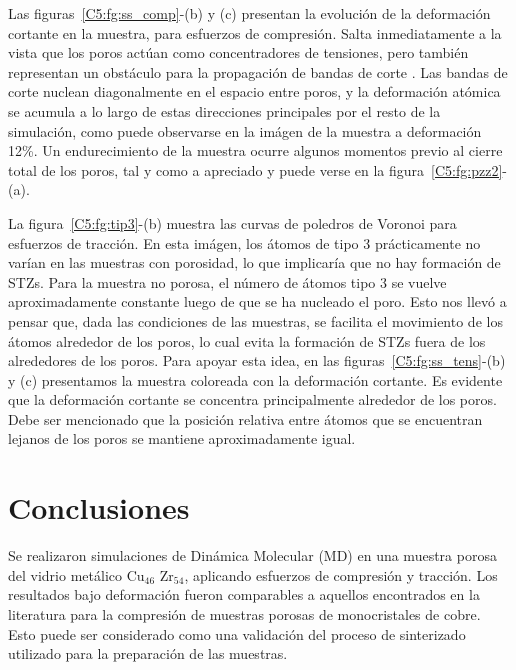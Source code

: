 Las figuras~\ref{C5:fg:ss_comp}-(b) y (c) presentan la evolución de la deformación cortante en la muestra, para esfuerzos de compresión.
Salta inmediatamente a la vista que los poros actúan como concentradores de tensiones, pero también representan un obstáculo para la
propagación de bandas de corte \citep{wang10}. Las bandas de corte nuclean diagonalmente en el espacio entre poros, y la deformación atómica
se acumula a lo largo de estas direcciones principales por el resto de la simulación, como puede observarse en la imágen de la muestra a 
deformación 12\%. Un endurecimiento de la muestra ocurre algunos momentos previo al cierre total de los poros, tal y como a apreciado
\cite{yuan14} y puede verse en la figura~\ref{C5:fg:pzz2}-(a).

La figura~\ref{C5:fg:tip3}-(b) muestra las curvas de poledros de Voronoi para esfuerzos de tracción. En esta imágen, los átomos de tipo 3
prácticamente no varían en las muestras con porosidad, lo que implicaría que no hay formación de STZs.
Para la muestra no porosa, el número de átomos tipo 3 se vuelve aproximadamente constante luego de que se ha nucleado el poro. Esto
nos llevó a pensar que, dada las condiciones de las muestras, se facilita el movimiento de los átomos alrededor de los poros, lo cual evita
la formación de STZs fuera de los alrededores de los poros. Para apoyar esta idea, en las figuras~\ref{C5:fg:ss_tens}-(b) y (c) presentamos
la muestra coloreada con la deformación cortante. Es evidente que la deformación cortante se concentra principalmente alrededor
de los poros. Debe ser mencionado que la posición relativa entre átomos que se encuentran lejanos de los poros se mantiene aproximadamente igual.



\section{Conclusiones}
\label{S5_4}

Se realizaron simulaciones de Dinámica Molecular (MD) en una muestra porosa del vidrio metálico Cu$_{46}$ Zr$_{54}$, aplicando esfuerzos
de compresión y tracción. Los resultados bajo deformación fueron comparables a aquellos encontrados en la literatura \citep{yuan14} para
la compresión de muestras porosas de monocristales de cobre. Esto puede ser considerado como una validación del proceso de sinterizado 
utilizado para la preparación de las muestras.

